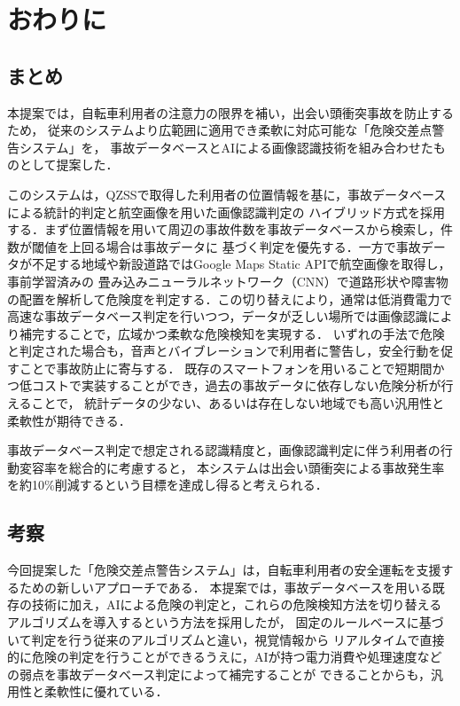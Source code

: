 \documentclass[uplatex,dvipdfmx]{jsarticle}
\begin{document}
\section{おわりに}
\subsection{まとめ}
本提案では，自転車利用者の注意力の限界を補い，出会い頭衝突事故を防止するため，
従来のシステムより広範囲に適用でき柔軟に対応可能な「危険交差点警告システム」を，
事故データベースとAIによる画像認識技術を組み合わせたものとして提案した．

このシステムは，QZSSで取得した利用者の位置情報を基に，事故データベースによる統計的判定と航空画像を用いた画像認識判定の
ハイブリッド方式を採用する．まず位置情報を用いて周辺の事故件数を事故データベースから検索し，件数が閾値を上回る場合は事故データに
基づく判定を優先する．一方で事故データが不足する地域や新設道路ではGoogle Maps Static APIで航空画像を取得し，事前学習済みの
畳み込みニューラルネットワーク（CNN）で道路形状や障害物の配置を解析して危険度を判定する．この切り替えにより，通常は低消費電力で
高速な事故データベース判定を行いつつ，データが乏しい場所では画像認識により補完することで，広域かつ柔軟な危険検知を実現する．
いずれの手法で危険と判定された場合も，音声とバイブレーションで利用者に警告し，安全行動を促すことで事故防止に寄与する．
既存のスマートフォンを用いることで短期間かつ低コストで実装することができ，過去の事故データに依存しない危険分析が行えることで，
統計データの少ない、あるいは存在しない地域でも高い汎用性と柔軟性が期待できる．

事故データベース判定で想定される認識精度と，画像認識判定に伴う利用者の行動変容率を総合的に考慮すると，
本システムは出会い頭衝突による事故発生率を約10\%削減するという目標を達成し得ると考えられる．

\subsection{考察}
今回提案した「危険交差点警告システム」は，自転車利用者の安全運転を支援するための新しいアプローチである．
本提案では，事故データベースを用いる既存の技術に加え，AIによる危険の判定と，これらの危険検知方法を切り替えるアルゴリズムを導入するという方法を採用したが，
固定のルールベースに基づいて判定を行う従来のアルゴリズムと違い，視覚情報から
リアルタイムで直接的に危険の判定を行うことができるうえに，AIが持つ電力消費や処理速度などの弱点を事故データベース判定によって補完することが
できることからも，汎用性と柔軟性に優れている．
\end{document}
